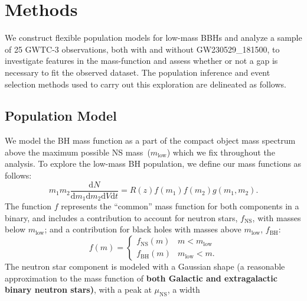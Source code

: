 \documentclass[modern]{aastex631}
\newcommand{\dd}{\ensuremath{\mathrm{d}}}
\begin{document}
\section{Methods}
\label{sec:methods}
\noindent
We construct flexible population models for low-mass BBHs and analyze a sample of 25 GWTC-3 observations, both with and without GW230529\_181500, to investigate features in the mass-function and assess whether or not a gap is necessary to fit the observed dataset. The population inference and event selection methods used to carry out this exploration are delineated as follows.
\subsection{Population Model}
\noindent
We model the BH mass function as a part of the compact object mass spectrum
above the maximum possible NS mass~($m_\mathrm{low}$) which we fix throughout
the analysis. To explore the low-mass BH population, we define our mass
functions as follows:
\begin{equation}
    \label{eq:intensity-definition}
    m_1 m_2 \frac{\dd N}{\dd m_1 \dd m_2 \dd V \dd t} = R(z) f\left( m_1 \right) f\left( m_2 \right) g(m_1, m_2).
\end{equation}
\noindent
The function $f$ represents the ``common'' mass function for both components in
a binary, and includes a contribution to account for neutron stars,
$f_\mathrm{NS}$, with masses below $m_\mathrm{low}$; and a contribution for
black holes with masses above $m_\mathrm{low}$, $f_\mathrm{BH}$:
\begin{equation}
    f(m) = \begin{cases}
        f_\mathrm{NS}(m) & m < m_\mathrm{low} \\
        f_\mathrm{BH}(m) & m_\mathrm{low} < m.
    \end{cases}
\end{equation}
The neutron star component is modeled with a Gaussian shape (a reasonable
approximation to the mass function of \textbf{both Galactic \citep{Farr2020,Farrow:2019xnc, Alsing2018,} and extragalactic~\citep{Landry:2021hvl, Galaudage:2020zst} binary neutron stars)}, with a peak at $\mu_\mathrm{NS}$, a width
\end{document}
